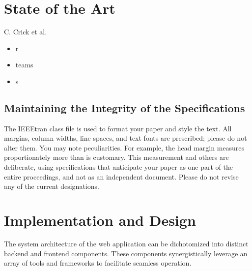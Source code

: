 \documentclass[conference]{IEEEtran}
\begin{document}
\section{State of the Art}
C. Crick et al.  
\begin{itemize}
\item r
\item teams
\item s
\end{itemize}

\subsection{Maintaining the Integrity of the Specifications}

The IEEEtran class file is used to format your paper and style the text. All margins, 
column widths, line spaces, and text fonts are prescribed; please do not 
alter them. You may note peculiarities. For example, the head margin
measures proportionately more than is customary. This measurement 
and others are deliberate, using specifications that anticipate your paper 
as one part of the entire proceedings, and not as an independent document. 
Please do not revise any of the current designations.

\section{Implementation and Design}
The system architecture of the web application can be dichotomized into distinct backend and frontend components. These components synergistically leverage an array of tools and frameworks to facilitate seamless operation.
\end{document}
